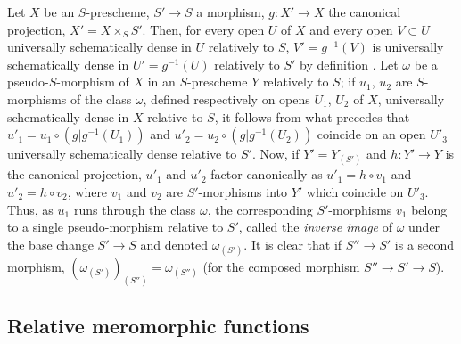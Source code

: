 \begin{env}[20.5.8]
\label{IV.20.5.8}
Let $X$ be an $S$-prescheme, $S'\to S$ a morphism, $g:X'\to X$ the canonical projection, $X'=X\times_S S'$.
Then, for every open $U$ of $X$ and every open $V\subset U$ universally schematically dense in $U$ relatively to $S$, $V'=g^{-1}(V)$ is universally schematically dense in $U'=g^{-1}(U)$ relatively to $S'$ by definition .
Let $\omega$ be a pseudo-$S$-morphism of $X$ in an $S$-prescheme $Y$ relatively to $S$;
if $u_1$, $u_2$ are $S$-morphisms of the class $\omega$, defined respectively on opens $U_1$, $U_2$ of $X$, universally schematically dense in $X$ relative to $S$, it follows from what precedes that $u'_1=u_1\circ(g|g^{-1}(U_1))$ and $u'_2=u_2\circ(g|g^{-1}(U_2))$ coincide on an open $U'_3$ universally schematically dense relative to $S'$.
Now, if $Y'=Y_{(S')}$ and $h:Y'\to Y$ is the canonical projection, $u'_1$ and $u'_2$ factor canonically as $u'_1=h\circ v_1$ and $u'_2=h\circ v_2$, where $v_1$ and $v_2$ are $S'$-morphisms into $Y'$ which coincide on $U'_3$.
Thus, as $u_1$ runs through the class $\omega$, the corresponding $S'$-morphisms $v_1$ belong to a single pseudo-morphism relative to $S'$, called the \emph{inverse image} of $\omega$ under the base change $S'\to S$ and denoted $\omega_{(S')}$.
It is clear that if $S''\to S'$ is a second morphism, $(\omega_{(S')})_{(S'')}=\omega_{(S'')}$ (for the composed morphism $S''\to S'\to S$).
\end{env}

\subsection{Relative meromorphic functions}
\label{IV.20.6}

